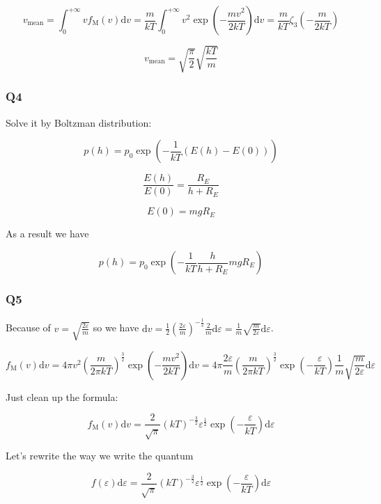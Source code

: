 \documentclass[a4paper,11pt]{amsart}
\theoremstyle{definition}
\begin{document}
	$$
	v_{\mathrm{mean}}=\int_0^{+\infty}{vf_{\mathrm{M}}\left( v \right) \mathrm{d}v=\frac{m}{kT}\int_0^{+\infty}{v^2\exp \left( -\frac{mv^2}{2kT} \right) \mathrm{d}v=\frac{m}{kT}\zeta _3\left( -\frac{m}{2kT} \right)}}
	$$
	
	$$
	v_{\mathrm{mean}}=\sqrt{\frac{\pi}{2}}\sqrt{\frac{kT}{m}}
	$$
	
    \subsubsection*{Q4}

	Solve it by Boltzman distribution:
	
	$$
	p\left( h \right) =p_0\exp \left( -\frac{1}{kT}\left( E\left( h \right) -E\left( 0 \right) \right) \right) 
	$$
	
	$$
	\frac{E\left( h \right)}{E\left( 0 \right)}=\frac{R_E}{h+R_E}
	$$
	
	$$
	E\left( 0 \right) =mgR_E
	$$
	
	As a result we have
	
	$$
	p\left( h \right) =p_0\exp \left( -\frac{1}{kT}\frac{h}{h+R_E}mgR_E \right) 
	$$
	
    \subsubsection*{Q5}
	
	Because of $\displaystyle v=\sqrt{\frac{2\varepsilon}{m}}$ so we have $\displaystyle\mathrm{d}v=\frac{1}{2}\left( \frac{2\varepsilon}{m} \right) ^{-\tfrac{1}{2}}\frac{2}{m}\mathrm{d}\varepsilon=\frac{1}{m}\sqrt{\frac{m}{2\varepsilon}}\mathrm{d}\varepsilon$.
	
	$$
	f_{\mathrm{M}}\left( v \right) \mathrm{d}v=4\pi v^2\left( \frac{m}{2\pi kT} \right) ^{\tfrac{3}{2}}\exp \left( -\frac{mv^2}{2kT} \right) \mathrm{d}v=4\pi \frac{2\varepsilon}{m}\left( \frac{m}{2\pi kT} \right) ^{\tfrac{3}{2}}\exp \left( -\frac{\varepsilon}{kT} \right) \frac{1}{m}\sqrt{\frac{m}{2\varepsilon}}\mathrm{d}\varepsilon 
	$$
	
	Just clean up the formula:
	
	$$
	f_{\mathrm{M}}\left( v \right) \mathrm{d}v=\frac{2}{\sqrt{\pi}}\left( kT \right) ^{-\tfrac{3}{2}}\varepsilon ^{\tfrac{1}{2}}\exp \left( -\frac{\varepsilon}{kT} \right) \mathrm{d}\varepsilon 
	$$
	
	Let's rewrite the way we write the quantum
	
	$$
	f\left( \varepsilon \right) \mathrm{d}\varepsilon =\frac{2}{\sqrt{\pi}}\left( kT \right) ^{-\tfrac{3}{2}}\varepsilon ^{\tfrac{1}{2}}\exp \left( -\frac{\varepsilon}{kT} \right) \mathrm{d}\varepsilon 
	$$
	
\end{document}
